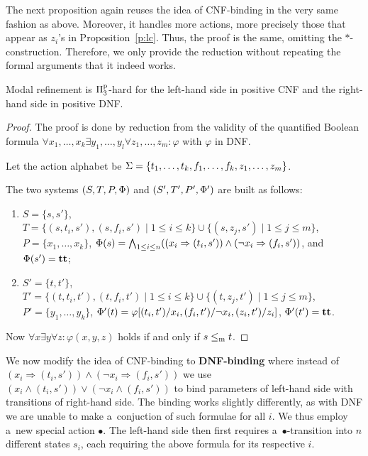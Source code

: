 The next proposition again reuses the idea of CNF-binding in the very same fashion as above. Moreover, it handles more actions, more precisely those that appear as $z_i$'s in Proposition~\ref{p:lc}. Thus, the proof is the same, omitting the $*$-construction. Therefore, we only provide the reduction without repeating the formal arguments that it indeed works.

\begin{proposition}\label{p:lcrd}
Modal refinement is $\mathrm\Pi^\mathrm p_3$-hard for the left-hand side 
in positive CNF and the right-hand side in positive DNF.
\end{proposition}
\begin{proof}
The proof is done by reduction from the validity of 
the quantified Boolean formula
$\forall x_1, \ldots, x_k
\exists y_1,\ldots, y_l \forall z_1,\ldots, z_m
: \varphi$ with $\varphi$ in DNF. 

Let the action alphabet be $\mathrm{\Sigma} = \{t_1, \ldots, t_k, f_1, \ldots, f_k, 
  z_1, \ldots, z_m \}$.

The two systems $(S,T,P,\mathrm{\Phi})$ and $(S',T',P',\mathrm{\Phi}')$ are built as
follows: 
\begin{enumerate}
    \item $S = \{s, s'\}$, 
    $T = \{ (s,t_i,s'), (s,f_i,s') \mid 1 \le i \le k\} \cup \{ (s, z_j, s') \mid 1 \le j \le m \}$, \\
    $P = \{x_1, \ldots, x_k\}$,
    $\mathrm{\Phi}(s) = \bigwedge_{1 \le i \le n} ((x_i \Rightarrow (t_i,s')) \wedge (\neg x_i \Rightarrow (f_i,s'))$, and
    $\mathrm{\Phi}(s') = \mathbf{tt}$;
    \item $S' = \{t, t'\}$, 
    $T' = \{(t,t_i,t'), (t,f_i,t') \mid 1 \le i \le k\} \cup \{(t, z_j, t')\mid 1 \le j \le m\}$, \\
    $P' = \{y_1, \ldots, y_k\}$,
    $\mathrm{\Phi}'(t) = \varphi[(t_i,t')/x_i,(f_i,t')/\neg x_i,(z_i,t')/z_i]$,
    $\mathrm{\Phi}'(t') = \mathbf{tt}$.
\end{enumerate}

Now $\forall x \exists y \forall z : \varphi(x,y,z)$ holds if and only if
$s \le_\mathrm m t$.
\end{proof}

We now modify the idea of CNF-binding to \textbf{DNF-binding} where instead of $(x_i \Rightarrow (t_i,s')) \wedge (\neg x_i \Rightarrow (f_i,s'))$ we use $(x_i \wedge (t_i,s')) \vee (\neg x_i \wedge (f_i,s'))$ to bind parameters of 
left-hand side with transitions of right-hand side. 
The binding works slightly differently, as with DNF we are unable to make
a~conjuction of such formulae for all $i$. We thus employ 
a~new special action $\bullet$. The left-hand side then first requires
a~$\bullet$-transition into $n$ different states $s_i$, each requiring
the above formula for its respective $i$.


